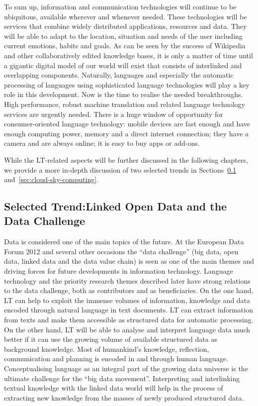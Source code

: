 \documentclass[10pt, plain]{../../metanetpaper}
\begin{document}
\begin{multicols}{2}
To sum up, information and communication technologies will continue to be ubiquitous, available wherever and whenever needed. These technologies will be services that combine widely distributed applications, resources and data. They will be able to adapt to the location, situation and needs of the user including current emotions, habits and goals. As can be seen by the success of Wikipedia and other collaboratively edited knowledge bases, it is only a matter of time until a gigantic digital model of our world will exist that consists of interlinked and overlapping components. Naturally, languages and especially the automatic processing of languages using sophisticated language technologies will play a key role in this development. Now is the time to realise the needed breakthroughs. High performance, robust machine translation and related language technology services are urgently needed. There is a huge window of opportunity for consumer-oriented language technology: mobile devices are fast enough and have enough computing power, memory and a direct internet connection; they have a camera and are always online; it is easy to buy apps or add-ons.

While the LT-related aspects will be further discussed in the following chapters, we provide a more in-depth discussion of two selected trends in Sections~\ref{sec:linked-data-open} and~\ref{sec:cloud-sky-computing}.

\subsection[Selected Trend: Linked Open Data and the Data Challenge]{Selected Trend:\newline Linked Open Data and the Data Challenge}
\label{sec:linked-data-open}

Data is considered one of the main topics of the future. At the European Data Forum 2012 and several other occasions the ``data challenge'' (big data, open data, linked data and the data value chain) is seen as one of the main themes and driving forces for future developments in information technology. Language technology and the priority research themes described later have strong relations to the data challenge, both as contributors and as beneficiaries. On the one hand, LT can help to exploit the immense volumes of information, knowledge and data encoded through natural language in text documents. LT can extract information from texts and make them accessible as structured data for automatic processing. On the other hand, LT will be able to analyse and interpret language data much better if it can use the growing volume of available structured data as background knowledge. 
%
Most of humankind's knowledge, reflection, communication and planning is encoded in and through human language. Conceptualising language as an integral part of the growing data universe is the ultimate challenge for the “big data movement”. Interpreting and interlinking textual knowledge with the linked data world will help in the process of extracting new knowledge from the masses of newly produced structured data.


\end{multicols}
\end{document}
